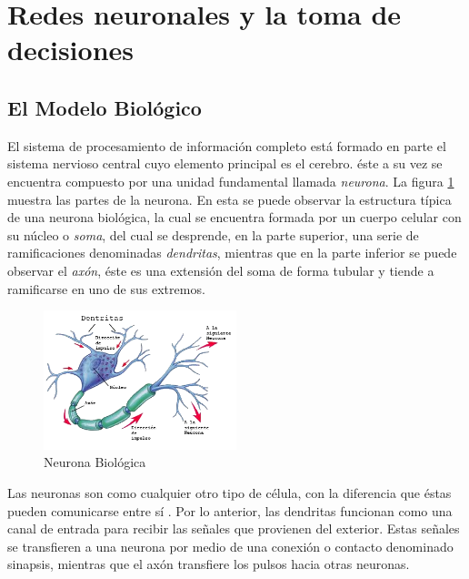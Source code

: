 \section{Redes neuronales y la toma de decisiones}
\subsection{El Modelo Biol\'{o}gico}
 
 		El sistema de procesamiento de informaci\'{o}n completo est\'{a} formado en parte el
 	sistema nervioso central cuyo elemento principal es el cerebro. \'{e}ste a su vez
 	se encuentra compuesto por una unidad fundamental llamada \textit{neurona}.
 	\cite{Kriesel2005} La figura \ref{fig:neuronaBio} muestra las partes de la
 	neurona. En esta se puede observar la estructura t\'{i}pica de una neurona biol\'{o}gica, la
 	cual se encuentra formada por un cuerpo celular con su n\'{u}cleo o
 	\textit{soma}, del cual se desprende, en la parte superior, una serie de
 	ramificaciones denominadas \textit{dendritas}, mientras que en la parte
 	inferior se puede observar el \textit{ax\'{o}n}, \'{e}ste es una extensi\'{o}n del soma de forma tubular y
 	tiende a ramificarse en uno de sus extremos.
 	
 	\begin{figure}[htp]
 		\centering
 		\includegraphics[width=0.5\textwidth]{images/TesisYGR-neuron.png}
 		\caption{Neurona Biol\'{o}gica}
 		\label{fig:neuronaBio}
 	\end{figure}
 	
 	 		Las neuronas son como cualquier otro tipo de c\'{e}lula, con la diferencia que
 	\'{e}stas pueden comunicarse entre s\'{i} \cite{Longo2011}. Por lo anterior, las dendritas
 	funcionan como una canal de entrada para recibir las se\~{n}ales que provienen del
 	exterior. Estas se\~{n}ales se transfieren a una neurona por medio de una conexi\'{o}n o contacto denominado sinapsis, mientras que el ax\'{o}n transfiere los pulsos hacia otras neuronas.

